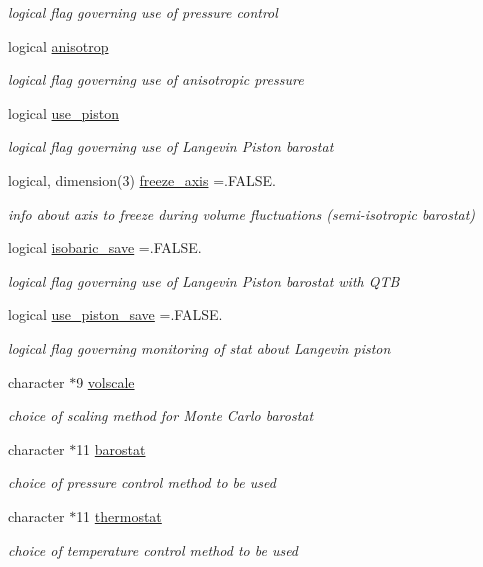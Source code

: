 \begin{DoxyCompactItemize}
\begin{DoxyCompactList}\small\item\em logical flag governing use of pressure control \end{DoxyCompactList}\item 
logical \hyperlink{classbath_adf1ab4c8599e36e94daa6c168a50dc42}{anisotrop}
\begin{DoxyCompactList}\small\item\em logical flag governing use of anisotropic pressure \end{DoxyCompactList}\item 
logical \hyperlink{classbath_a587fc21d72bea065a8b3bdd07d016bed}{use\-\_\-piston}
\begin{DoxyCompactList}\small\item\em logical flag governing use of Langevin Piston barostat \end{DoxyCompactList}\item 
logical, dimension(3) \hyperlink{classbath_a47529a9a6ecd22b03c1b236ea7a7acd9}{freeze\-\_\-axis} =.F\-A\-L\-S\-E.
\begin{DoxyCompactList}\small\item\em info about axis to freeze during volume fluctuations (semi-\/isotropic barostat) \end{DoxyCompactList}\item 
logical \hyperlink{classbath_a2a95f8a0816cbcbab171445abb24a216}{isobaric\-\_\-save} =.F\-A\-L\-S\-E.
\begin{DoxyCompactList}\small\item\em logical flag governing use of Langevin Piston barostat with Q\-T\-B \end{DoxyCompactList}\item 
logical \hyperlink{classbath_a95eb9a1e66e1b135ed1a51b1f2f590f2}{use\-\_\-piston\-\_\-save} =.F\-A\-L\-S\-E.
\begin{DoxyCompactList}\small\item\em logical flag governing monitoring of stat about Langevin piston \end{DoxyCompactList}\item 
character $\ast$9 \hyperlink{classbath_a91d816721d0a28155db7384add3bd4a6}{volscale}
\begin{DoxyCompactList}\small\item\em choice of scaling method for Monte Carlo barostat \end{DoxyCompactList}\item 
character $\ast$11 \hyperlink{classbath_a1f37229303acc7597c01ca348b462709}{barostat}
\begin{DoxyCompactList}\small\item\em choice of pressure control method to be used \end{DoxyCompactList}\item 
character $\ast$11 \hyperlink{classbath_aa9a2b3b2f92760da86d3c52fb3d9a3d6}{thermostat}
\begin{DoxyCompactList}\small\item\em choice of temperature control method to be used \end{DoxyCompactList}\end{DoxyCompactItemize}


